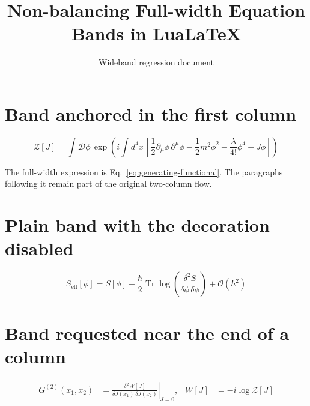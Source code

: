 \documentclass[twocolumn]{article}
\begin{document}
\title{Non-balancing Full-width Equation Bands in LuaLaTeX}
\author{Wideband regression document}
\date{}
\maketitle

\section{Band anchored in the first column}
\WBTextA

\begin{wideband}
\begin{equation}
  \mathcal{Z}[J] = \int \mathcal{D}\phi\,
  \exp\!\left(i\!\int d^4x\,
  \left[\frac12\partial_\mu\phi\,\partial^\mu\phi
  -\frac12m^2\phi^2-\frac{\lambda}{4!}\phi^4+J\phi\right]\right)
  \label{eq:generating-functional}
\end{equation}
\end{wideband}

The full-width expression is Eq.~\ref{eq:generating-functional}. The paragraphs
following it remain part of the original two-column flow.
\WBTextB
\WBTextC

\clearpage
\section{Plain band with the decoration disabled}
\widebandrulesoff
\WBTextD
\begin{wideband}
\begin{equation}
  S_{\mathrm{eff}}[\phi]=S[\phi]
  +\frac{\hbar}{2}\operatorname{Tr}\log
   \left(\frac{\delta^2S}{\delta\phi\,\delta\phi}\right)
  +\mathcal{O}(\hbar^2)
\end{equation}
\end{wideband}
\WBTextE

\clearpage
\section{Band requested near the end of a column}
\widebandruleson
{}
\setwidebandrulesep{8pt}
\WBTextA\WBTextB\WBTextF
\begin{wideband}
\begin{align}
  G^{(2)}(x_1,x_2)
    &=\left.\frac{\delta^2W[J]}
      {\delta J(x_1)\,\delta J(x_2)}\right|_{J=0}, &
  W[J]&=-i\log\mathcal{Z}[J]
\end{align}
\end{wideband}
\WBTextG\WBTextH
\end{document}
